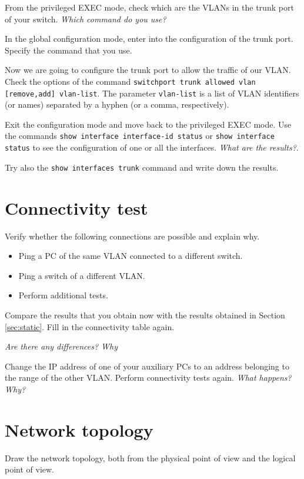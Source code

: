 From the privileged EXEC mode, check which are the VLANs in the trunk port of your switch.
\emph{Which command do you use?}

In the global configuration mode, enter into the configuration of the trunk port.
Specify the command that you use.

Now we are going to configure the trunk port to allow the traffic of our VLAN.
Check the options of the command \texttt{switchport trunk allowed vlan [remove,add] vlan-list}.
The parameter \texttt{vlan-list} is a list of VLAN identifiers (or names) separated by a  hyphen (or a comma, respectively).

Exit the configuration mode and move back to the privileged EXEC mode.
Use the commands \texttt{show interface interface-id status} or \texttt{show interface status} to see the configuration of one or all the interfaces.
\emph{What are the results?}.

Try also the \texttt{show interfaces trunk} command and write down the results.

\section{Connectivity test}

Verify whether the following connections are possible and explain why.
\begin{itemize}
\item Ping a PC of the same VLAN connected to a different switch.
\item Ping a  switch of a different VLAN.
\item Perform additional tests.
\end{itemize}

Compare the results that you obtain now with the results obtained in Section \ref{sec:static}.
Fill in the connectivity table again.

\emph{Are there any differences? Why}

Change the IP address of one of your auxiliary PCs to an address belonging to the range of the other VLAN.
Perform connectivity tests again.
\emph{What happens? Why?}

\section{Network topology}

Draw the network topology, both from the physical point of view and the logical point of view.

